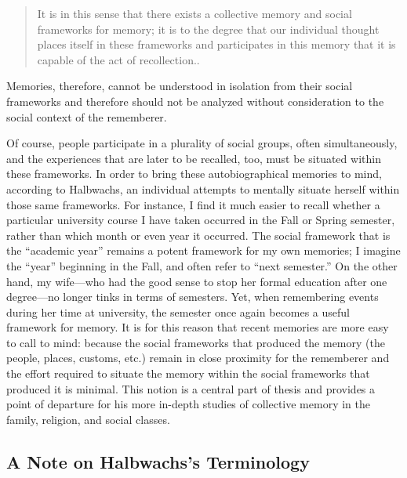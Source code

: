 \begin{quote}
It is in this sense that there exists a collective memory and social
frameworks for memory; it is to the degree that our individual thought
places itself in these frameworks and participates in this memory that
it is capable of the act of recollection.\autocite[38]{halbwachs1992}.
\end{quote}

Memories, therefore, cannot be understood in isolation from their social
frameworks and therefore should not be analyzed without consideration to
the social context of the rememberer.

Of course, people participate in a plurality of social groups, often
simultaneously, and the experiences that are later to be recalled, too,
must be situated within these frameworks. In order to bring these
autobiographical memories to mind, according to Halbwachs, an individual
attempts to mentally situate herself within those same frameworks. For
instance, I find it much easier to recall whether a particular
university course I have taken occurred in the Fall or Spring semester,
rather than which month or even year it occurred. The social framework
that is the ``academic year'' remains a potent framework for my own
memories; I imagine the ``year'' beginning in the Fall, and often refer
to ``next semester.'' On the other hand, my wife---who had the good
sense to stop her formal education after one degree---no longer tinks in
terms of semesters. Yet, when remembering events during her time at
university, the semester once again becomes a useful framework for
memory. It is for this reason that recent memories are more easy to call
to mind: because the social frameworks that produced the memory (the
people, places, customs, etc.) remain in close proximity for the
rememberer and the effort required to situate the memory within the
social frameworks that produced it is
minimal.\autocite[52]{halbwachs1992} This notion is a central part of
thesis and provides a point of departure for his more in-depth studies
of collective memory in the family, religion, and social classes.

\hypertarget{a-note-on-halbwachss-terminology}{%
\subsection{A Note on Halbwachs's
Terminology}\label{a-note-on-halbwachss-terminology}}

